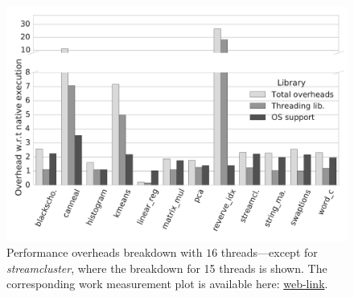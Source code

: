 
\begin{figure}[t]
\centering
\includegraphics[scale=0.25]{figure/benchmarks/times-16-threads.pdf}
\caption{Performance overheads breakdown with $16$ threads---except for {\em streamcluster}, where the breakdown for 15 threads is shown. The corresponding work measurement plot is available here: \href{https://mic92.github.io/inspector/index.html\#graph4}{web-link}.}
\label{fig:overheads-breakdown}
\end{figure}
